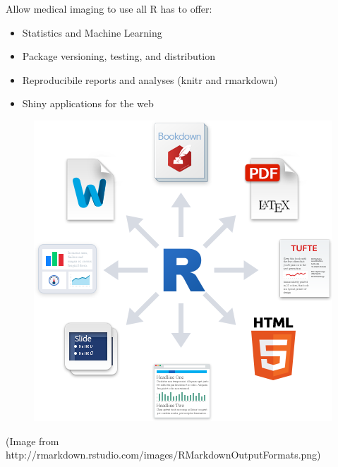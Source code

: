 \documentclass[final]{beamer}\usepackage[]{graphicx}\usepackage[]{color}
\begin{document}
\begin{frame}[fragile]
\begin{table}[!htb]
\begin{minipage}{0.21\linewidth}
Allow medical imaging to use all R has to offer:
  
\begin{multicols}{2}

\begin{itemize}
\item Statistics and Machine Learning
\item Package versioning, testing, and distribution 
\item Reproducibile reports and analyses (knitr and rmarkdown)
\item Shiny applications for the web
\end{itemize}

\vfill
\columnbreak
\begin{figure}[h]
\centering
\includegraphics[width=\linewidth]{figures/RMarkdownOutputFormats.png}
\end{figure}
{\tiny (Image from \\ 
http://rmarkdown.rstudio.com/images/RMarkdownOutputFormats.png)
}
\end{multicols}


\end{minipage}
\end{table}
\end{frame}
\end{document}
